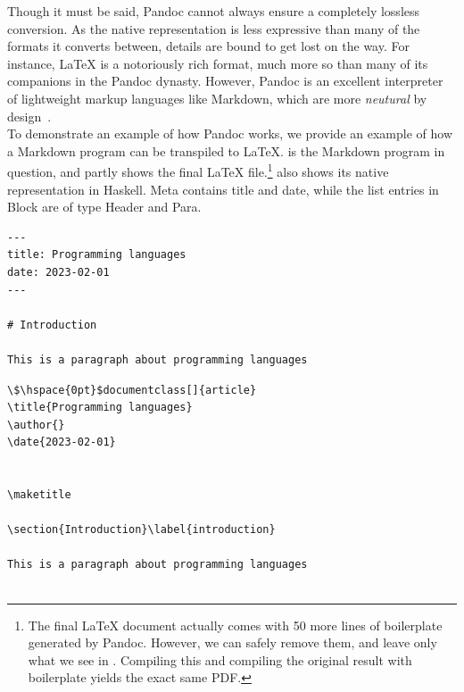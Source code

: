 Though it must be said, Pandoc cannot always ensure a completely lossless conversion. As the native representation is less expressive than many of the formats it converts between, details are bound to get lost on the way. For instance, LaTeX is a notoriously rich format, much more so than many of its companions in the Pandoc dynasty. However, Pandoc is an excellent interpreter of lightweight markup languages like Markdown, which are more \textit{neutural} by design~\cite{whatIsPandoc}. \\

To demonstrate an example of how Pandoc works, we provide an example of how a Markdown program can be transpiled to LaTeX.  is the Markdown program in question, and  partly shows the final LaTeX file.\footnote{The final LaTeX document actually comes with 50 more lines of boilerplate generated by Pandoc. However, we can safely remove them, and leave only what we see in . Compiling this and compiling the original result with boilerplate yields the exact same PDF.}  also shows its native representation in Haskell. Meta contains title and date, while the list entries in Block are of type Header and Para. \\

\begin{lstlisting}[caption={A program written in Markdown.}, captionpos=b, label={markdownProgram}]
---
title: Programming languages
date: 2023-02-01
---

# Introduction

This is a paragraph about programming languages

\end{lstlisting}

\begin{lstlisting}[caption={The result of transpiling \Cref{markdownProgram} to LaTeX.}, captionpos=b, label={pandocLatex}]
\$\hspace{0pt}$documentclass[]{article}
\title{Programming languages}
\author{}
\date{2023-02-01}


\maketitle

\section{Introduction}\label{introduction}

This is a paragraph about programming languages


\end{lstlisting}

